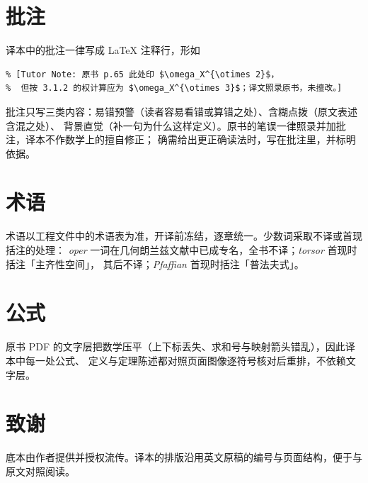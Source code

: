 \section*{批注}

译本中的批注一律写成 \LaTeX{} 注释行，形如

\begin{verbatim}
% [Tutor Note: 原书 p.65 此处印 $\omega_X^{\otimes 2}$，
%  但按 3.1.2 的权计算应为 $\omega_X^{\otimes 3}$；译文照录原书，未擅改。]
\end{verbatim}

批注只写三类内容：易错预警（读者容易看错或算错之处）、含糊点拨（原文表述含混之处）、
背景直觉（补一句为什么这样定义）。原书的笔误一律照录并加批注，译本不作数学上的擅自修正；
确需给出更正确读法时，写在批注里，并标明依据。

\section*{术语}

术语以工程文件中的术语表为准，开译前冻结，逐章统一。少数词采取不译或首现括注的处理：
\emph{oper} 一词在几何朗兰兹文献中已成专名，全书不译；\emph{torsor} 首现时括注「主齐性空间」，
其后不译；\emph{Pfaffian} 首现时括注「普法夫式」。

\section*{公式}

原书 PDF 的文字层把数学压平（上下标丢失、求和号与映射箭头错乱），因此译本中每一处公式、
定义与定理陈述都对照页面图像逐符号核对后重排，不依赖文字层。

\section*{致谢}

底本由作者提供并授权流传。译本的排版沿用英文原稿的编号与页面结构，便于与原文对照阅读。
